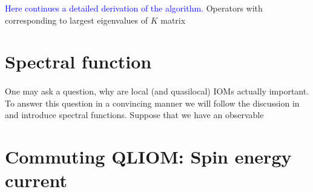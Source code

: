   
  \textcolor{blue}{Here continues a detailed derivation of the algorithm.}
  Operators with corresponding to largest eigenvalues of \(K\) matrix 
  

  \section{Spectral function\label{sec:spectral function}}

  \paragraph{}One may ask a question, why are local (and quasilocal) IOMs actually important. To answer this
  question in a convincing manner we will follow the discussion in~\textcite{Vidmar2021} and
  introduce spectral functions. Suppose that we have an observable  


\section{Commuting QLIOM: Spin energy current}

